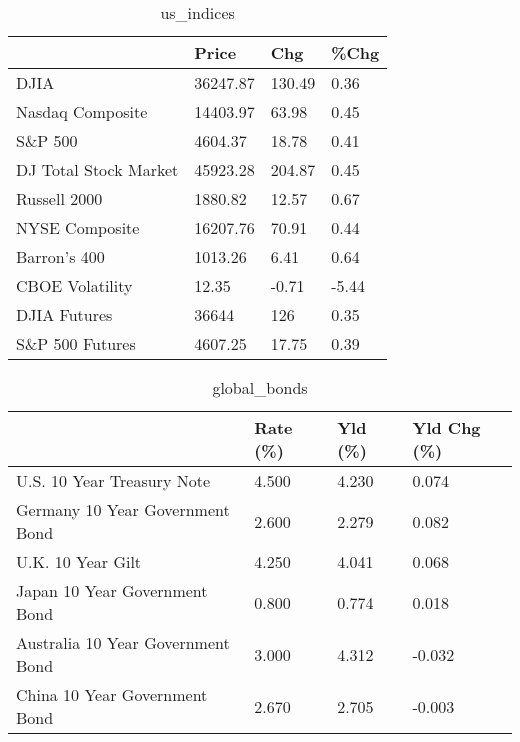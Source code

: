 \documentclass{article}%
\begin{document}
%


\begin{table}[htbp]%
\caption{us\_indices}%
\centering%
\begin{adjustbox}{width=1\textwidth}%
\begin{tabular}{llll}
\toprule
                      &    Price &    Chg &  \%Chg \\
\midrule
                 DJIA & 36247.87 & 130.49 &  0.36 \\
     Nasdaq Composite & 14403.97 &  63.98 &  0.45 \\
              S\&P 500 &  4604.37 &  18.78 &  0.41 \\
DJ Total Stock Market & 45923.28 & 204.87 &  0.45 \\
         Russell 2000 &  1880.82 &  12.57 &  0.67 \\
       NYSE Composite & 16207.76 &  70.91 &  0.44 \\
         Barron's 400 &  1013.26 &   6.41 &  0.64 \\
      CBOE Volatility &    12.35 &  -0.71 & -5.44 \\
         DJIA Futures &    36644 &    126 &  0.35 \\
      S\&P 500 Futures &  4607.25 &  17.75 &  0.39 \\
\bottomrule
\end{tabular}
%
\end{adjustbox}%
\end{table}

%


\begin{table}[htbp]%
\caption{global\_bonds}%
\centering%
\begin{adjustbox}{width=1\textwidth}%
\begin{tabular}{llll}
\toprule
                                  & Rate (\%) & Yld (\%) & Yld Chg (\%) \\
\midrule
       U.S. 10 Year Treasury Note &    4.500 &   4.230 &       0.074 \\
  Germany 10 Year Government Bond &    2.600 &   2.279 &       0.082 \\
                U.K. 10 Year Gilt &    4.250 &   4.041 &       0.068 \\
    Japan 10 Year Government Bond &    0.800 &   0.774 &       0.018 \\
Australia 10 Year Government Bond &    3.000 &   4.312 &      -0.032 \\
    China 10 Year Government Bond &    2.670 &   2.705 &      -0.003 \\
\bottomrule
\end{tabular}
%
\end{adjustbox}%
\end{table}
\end{document}
